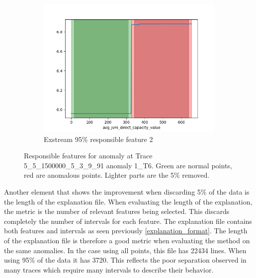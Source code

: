 \documentclass[oneside, a4paper, onecolumn, 11pt]{article}
\begin{document}
\begin{figure}[H]
\begin{subfigure}{0.3\textwidth}
      \includegraphics[width=\linewidth]{images/ex_remove52.png}
      \caption{Exstream 95\% responsible feature 2}
  \end{subfigure}
  \caption{Responsible features for anomaly at Trace 5\_5\_1500000\_5\_3\_9\_91 anomaly 1\_T6. Green are normal points, red are anomalous points. Lighter parts are the 5\% removed.}
\end{figure}
Another element that shows the improvement when discarding 5\% of the data is the length of the explanation file. When evaluating the length of the explanation, the metric is the number of relevant features being selected. This discards completely the number of intervals for each feature. The explanation file contains both features and intervals as seen previously \autoref{explanation_format}. The length of the explanation file is therefore a good metric when evaluating the method on the same anomalies. In the case using all points, this file has 22434 lines. When using 95\% of the data it has 3720. This reflects the poor separation observed in many traces which require many intervals to describe their behavior.\\
\end{document}
